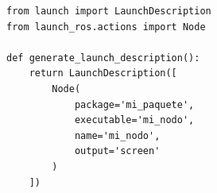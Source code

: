 \begin{figure}[t]
\centering
\begin{lstlisting}[style=python,
    caption={Estructura mínima de un launch file.},
    label={lst:estructura_minima}]
from launch import LaunchDescription
from launch_ros.actions import Node

def generate_launch_description():
    return LaunchDescription([
        Node(
            package='mi_paquete',
            executable='mi_nodo',
            name='mi_nodo',
            output='screen'
        )
    ])
\end{lstlisting}
\end{figure}
